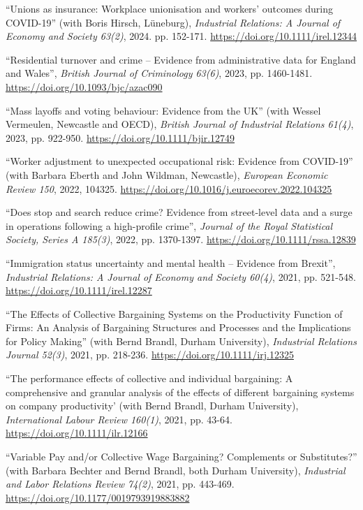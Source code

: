 \documentclass[10pt,pdftex,a4paper,oneside]{article}
\begin{document}
\begin{etaremune}
\item ``Unions as insurance: Workplace unionisation and workers' outcomes during COVID-19'' (with Boris Hirsch, L{\"u}neburg), \emph{Industrial Relations: A Journal of Economy and Society 63(2)}, 2024. pp. 152-171. \url{https://doi.org/10.1111/irel.12344}
\item ``Residential turnover and crime -- Evidence from administrative data for England and Wales'',  \emph{British Journal of Criminology 63(6)}, 2023, pp. 1460-1481.  \url{https://doi.org/10.1093/bjc/azac090}
\item ``Mass layoffs and voting behaviour: Evidence from the UK'' (with Wessel Vermeulen, Newcastle and OECD), \emph{British Journal of Industrial Relations 61(4)}, 2023, pp. 922-950.  \url{https://doi.org/10.1111/bjir.12749}
\item ``Worker adjustment to unexpected occupational risk: Evidence from COVID-19'' (with Barbara Eberth and John Wildman, Newcastle), \emph{European Economic Review 150}, 2022, 104325.  \url{https://doi.org/10.1016/j.euroecorev.2022.104325}
\item ``Does stop and search reduce crime? Evidence from street-level data and a surge in operations following a high-profile crime'', \emph{Journal of the Royal Statistical Society, Series A 185(3)}, 2022, pp. 1370-1397.  \url{https://doi.org/10.1111/rssa.12839}
\item ``Immigration status uncertainty and mental health -- Evidence from Brexit'', \emph{Industrial Relations: A Journal of Economy and Society 60(4)}, 2021, pp. 521-548. \url{https://doi.org/10.1111/irel.12287}
\item ``The Effects of Collective Bargaining Systems on the Productivity Function of Firms: An Analysis of Bargaining Structures and Processes and the Implications for Policy Making'' (with Bernd Brandl, Durham University), \emph{Industrial Relations Journal 52(3)}, 2021, pp. 218-236.  \url{https://doi.org/10.1111/irj.12325}
\item ``The performance effects of collective and individual bargaining: A comprehensive and granular analysis of the effects of different bargaining systems on company productivity' (with Bernd Brandl, Durham University), \emph{International Labour Review 160(1)}, 2021, pp. 43-64.   \url{https://doi.org/10.1111/ilr.12166}
\item ``Variable Pay and/or Collective Wage Bargaining? Complements or Substitutes?'' (with Barbara Bechter and Bernd Brandl, both Durham University), \emph{Industrial and Labor Relations Review 74(2)}, 2021, pp. 443-469.   \url{https://doi.org/10.1177/0019793919883882}

\end{etaremune}
\end{document}
